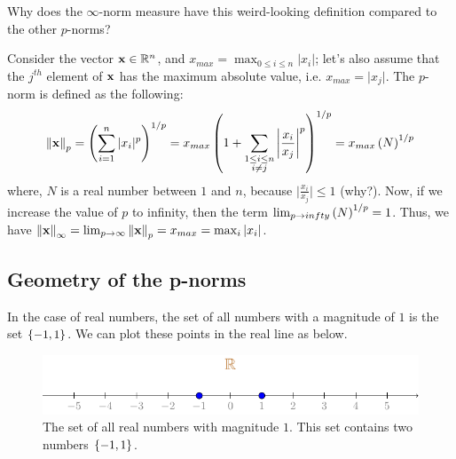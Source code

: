 \begin{boxedstuff}
    \begin{problem}
        Why does the $\infty$-norm measure have this weird-looking definition compared to the other $p$-norms?
        \begin{solution}
            Consider the vector $\mathbf{x} \in \mathbb{R}^n$, and $x_{max} = \max_{0 \leq i \leq n} \vert x_i \vert$; let's also assume that the $j^{th}$ element of $\mathbf{x}$ has the maximum absolute value, i.e. $x_{max} = \vert x_j \vert$. The $p$-norm is defined as the following:
            \[ \begin{split} 
                \norm{\mathbf{x}}_p &= \left( \sum_{i=1}^{n} \vert x_i \vert^p \right)^{1/p} = x_{max} \left( 1 + \sum_{\substack{1 \leq i \leq n \\ i \neq j}} \left\lvert \frac{x_i}{x_j} \right\rvert^p \right)^{1/p} = x_{max}\left( N \right)^{1/p}\\
            \end{split}
            \]
            where, $N$ is a real number between $1$ and $n$, because $\vert \frac{x_i}{x_j} \vert \leq 1$ (why?). Now, if we increase the value of $p$ to infinity, then the term $\lim_{p \to infty} \left( N \right)^{1/p}= 1$. Thus, we have $\left\lVert \mathbf{x} \right\rVert_{\infty} = \lim_{p \to \infty} \left\lVert \mathbf{x} \right\rVert_p = x_{max} = \max_{i} \left\lvert x_i \right\rvert$.
        \end{solution}
    \end{problem}
\end{boxedstuff}

\subsection{Geometry of the p-norms}
In the case of real numbers, the set of all numbers with a magnitude of $1$ is the set $\left\{ -1, 1 \right\}$. We can plot these points in the real line as below.

\begin{figure}[h]
    \centering
    \includegraphics{figure/chapter01/mag-locus.pdf}
    \caption{The set of all real numbers with magnitude $1$. This set contains two numbers $\left\{ -1, 1 \right\}$.}
    \label{fig:ch01-real-line-1-norm}
\end{figure}

